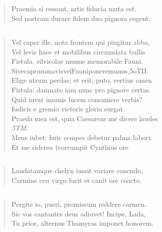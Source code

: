 \documentclass[11pt, a4paper]{report}
\begin{document}
            \subsection*{}
      \begin{verse}
      Praemia si cessant, artis fiducia muta est. \\ Sed nostram durare fidem duo pignora cogent: \\ 
      \end{verse}
  
            \subsection*{}
      \begin{verse}
      Vel caper ille, nota frontem qui pingitur abba, \\ Vel levis haec et mobilibus circumdata bullis \\ Fistula, silvicolae munus memorabile Fauni. \\ SivecaprummavisvelFauniponeremunus,5oTII. \\ Elige utrum perdas; et erit, puto, certius omen \\ Fistula: damnato iam nunc pro pignore certas. \\ Quid iuvat insanis lucem consumere verbis? \\ Iudicis e gremio victoris gloria surgat. \\ Praeda mea est, quia Caesareas me dicere laudes \\ \textit{5TM.} \\ Mens iubet: huic semper debetur palma labori. \\ Et me sidereo †corrumpit Cynthius ore \\ 
      \end{verse}
  
            \subsection*{}
      \begin{verse}
      Laudatamque chelyn iussit variare canendo, \\ Carmine ceu virgo furit et canit ore coacto. \\ 
      \end{verse}
  
            \subsection*{}
      \begin{verse}
      Pergite io, pueri, promissum reddere carmen. \\ Sic vos cantantes deus adiuvet! Incipe, Lada, \\ Tu prior, alternus Thamyras imponet honorem. \\ 
      \end{verse}
  
\end{document}
